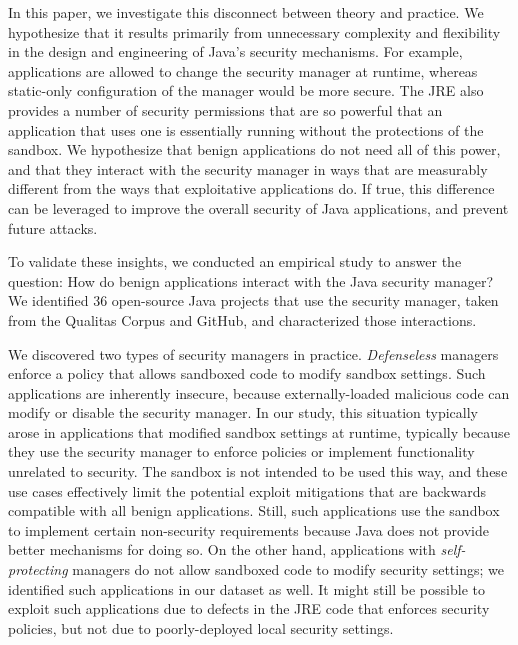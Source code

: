 \documentclass{sig-alternate}
\begin{document}
In this paper, we investigate this disconnect between theory and practice.  We
hypothesize that it results primarily from unnecessary complexity and flexibility
in the design and engineering of Java's security mechanisms.  For example,
applications are allowed to change the security manager at runtime, whereas 
static-only configuration of the manager would be more secure. The JRE also
provides a number of security permissions that are so powerful that an application
that uses one is essentially running without the protections of the sandbox. We 
hypothesize that benign applications do not need all of this power, and that
they interact with the security manager in ways
that are measurably different from the ways that exploitative applications do.  
If true, this difference can be leveraged to improve the overall security of
Java applications, and prevent future attacks.

To validate these insights, we conducted an empirical study
to answer the question: How do benign
applications interact with the Java security manager?  We identified 36
open-source Java projects that use the security manager, taken from the Qualitas
Corpus \cite{QualitasCorpus:APSEC:2010} and GitHub, and characterized
those interactions.

We discovered two types of security managers in
practice. \emph{Defenseless} managers enforce a policy that allows sandboxed code
to modify sandbox settings. Such applications
are inherently insecure, because externally-loaded malicious code can
modify or disable the security manager. In our study, this situation typically
arose in applications that modified sandbox settings at runtime, typically because
they use the security manager to enforce policies or implement functionality unrelated to security.
The sandbox is not intended to be used this way, and these use cases
effectively limit the potential exploit mitigations that are
backwards compatible with all benign applications. Still, such applications use the
sandbox to implement certain non-security requirements
because Java does not provide better mechanisms for doing so.  
On the other hand, applications with \emph{self-protecting} managers do 
not allow sandboxed code to modify
security settings; we identified such applications in our dataset as well.
It might still be possible to exploit
such applications due to defects in the JRE code that enforces security
policies, but not due to poorly-deployed local security settings.
\end{document}
